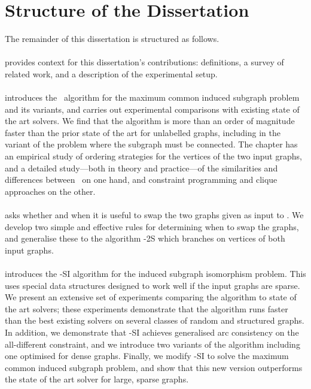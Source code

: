 \section{Structure of the Dissertation}

The remainder of this dissertation is structured as follows.

\paragraph*{} provides context for this dissertation's
contributions: definitions, a survey of related work, and a description of the
experimental setup.

\paragraph*{} introduces the \McSplit\
algorithm for the maximum common induced subgraph problem and its variants, and
carries out experimental comparisons with existing state of the art solvers.
We find that the algorithm is more than an order of magnitude faster than the prior
state of the art for unlabelled graphs, including in the variant of the problem
where the subgraph must be connected.
The chapter has an empirical study of ordering strategies for the vertices
of the two input graphs, and a detailed study---both in theory and practice---of
the similarities and differences
between \McSplit\ on one hand, and constraint programming and clique approaches
on the other.


\paragraph*{} asks whether and when it is
useful to swap the two graphs given as input to \McSplit.  We develop two
simple and effective rules for determining when to swap the graphs, and
generalise these to the algorithm \McSplit-2S which branches on vertices of
both input graphs.

\paragraph*{} introduces the \McSplit-SI algorithm for the
induced subgraph isomorphism problem.  This uses
special data structures designed to work well if the input graphs are sparse.
We present an extensive set of experiments comparing the algorithm to state of
the art solvers; these experiments demonstrate that the algorithm runs faster than the
best existing solvers on several classes of random and structured
graphs.
In addition, we demonstrate that \McSplit-SI achieves generalised arc consistency
on the all-different constraint, and we introduce two variants of the algorithm
including one optimised for dense graphs.
Finally, we modify \McSplit-SI to solve the maximum common
induced subgraph problem, and show that this new version outperforms the state of the art
solver for large, sparse graphs.

